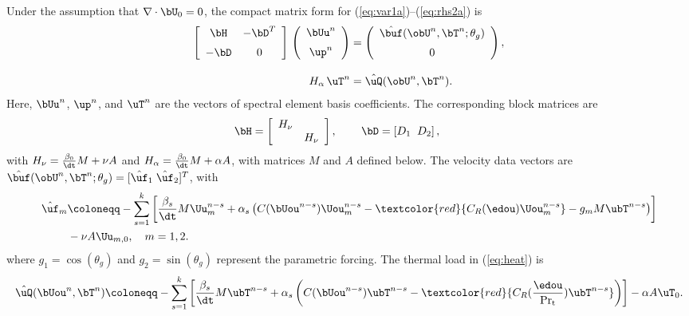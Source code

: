 Under the assumption that  $\nabla \cdot \bU_0 = 0$, the compact matrix form
\cite{maday1987well, maday1992pn, ronquist1987legendre} for
(\ref{eq:var1a})--(\ref{eq:rhs2a}) is
%
\begin{align} \label{eq:stokes}
   \left[ \begin{array}{cc} \bH & -\bD^T  \\[1.30ex] -\bD&  0
   \end{array}\right] \, \left( \begin{array}{c} \bUu^n \\[1.30ex] \up^n
   \end{array} \right) &= \left(\begin{array}{c}{\hat \buf(\obU^n,\bT^n;
   \theta_g)} \\[1.30ex]0\end{array}\right), \\[2ex]
   \label{eq:heat}
   H_{\alpha} \, \uT^n &= {\hat \uQ(\obU^n,\bT^n)}.
\end{align}
%
Here, $\bUu^n$, $\up^n$, and $\uT^n$ are the vectors of spectral element basis
coefficients.  The corresponding block matrices are
%
\begin{equation}  \label{eq:mat1}
   \bH = \left[ \begin{array}{cc} H_{\nu} & \\ & H_{\nu}
   \end{array} \right], \hspace{.3in}
   \bD = \left[ D_1 \;\; D_2 \right], \hspace{.3in}
\end{equation}
%
with $H_{\nu} = \frac{\beta_0}{\dt} M + \nu A$ and $H_{\alpha} =
\frac{\beta_0}{\dt} M + \alpha A$, with matrices $M$ and $A$ defined below.
The velocity data vectors are ${\hat \buf(\obU^n,\bT^n; \theta_g)}= [{\hat
\uf_1}\;{\hat \uf_2}]^T$, with
%
\begin{align} \label{eq:data1}
   \hat \uf_m & \coloneqq - \sum_{s=1}^k \left[ \frac{\beta_s}{\dt} M
\Uu_m^{n-s} + \alpha_s \left( C(\bUou^{n-s}) \Uou_m^{n-s} -
\textcolor{red}{C_R(\edou)\Uou_m^{n-s}} - g_m M \ubT^{n-s} \right) \right]
\nonumber \\ & - \nu A \Uu_{m,0}, \quad m=1,2.
\end{align}
%
where $g_1 = \cos(\theta_g)$ and $g_2=\sin(\theta_g)$ represent
the parametric forcing.  The thermal load in (\ref{eq:heat}) is
%
\begin{equation}
   \hat \uQ(\bUou^n,\bT^n) \coloneqq - \sum_{s=1}^k \left[ \frac{\beta_s}{\dt}
M \ubT^{n-s} + \alpha_s \left( C(\bUou^{n-s}) {\ubT}^{n-s} -
\textcolor{red}{C_R(\frac{\edou}{\rm Pr_t})\ubT^{n-s}} \right) \right] - \alpha
A \uT_0.
\end{equation}

